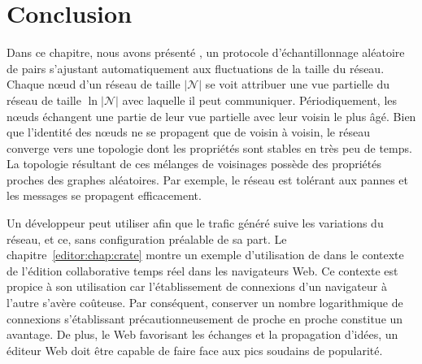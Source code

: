 
\section{Conclusion}
\label{net:sec:conclusion}

Dans ce chapitre, nous avons présenté \SPRAY, un protocole d'échantillonnage
aléatoire de pairs s'ajustant automatiquement aux fluctuations de la taille du
réseau. Chaque nœud d'un réseau de taille $|\mathcal{N}|$ se voit attribuer une
vue partielle du réseau de taille $\ln |\mathcal{N}|$ avec laquelle il peut
communiquer. Périodiquement, les nœuds échangent une partie de leur vue
partielle avec leur voisin le plus âgé. Bien que l'identité des nœuds ne se
propagent que de voisin à voisin, le réseau converge vers une topologie dont les
propriétés sont stables en très peu de temps. La topologie résultant de ces
mélanges de voisinages possède des propriétés proches des graphes
aléatoires. Par exemple, le réseau est tolérant aux pannes et les messages se
propagent efficacement.

Un développeur peut utiliser \SPRAY afin que le trafic généré suive les
variations du réseau, et ce, sans configuration préalable de sa part. Le
chapitre~\ref{editor:chap:crate} montre un exemple d'utilisation de \SPRAY dans
le contexte de l'édition collaborative temps réel dans les navigateurs Web.  Ce
contexte est propice à son utilisation car l'établissement de connexions d'un
navigateur à l'autre s'avère coûteuse. Par conséquent, conserver un nombre
logarithmique de connexions s'établissant précautionneusement de proche en
proche constitue un avantage. De plus, le Web favorisant les échanges et la
propagation d'idées, un éditeur Web doit être capable de faire face aux pics
soudains de popularité. 

